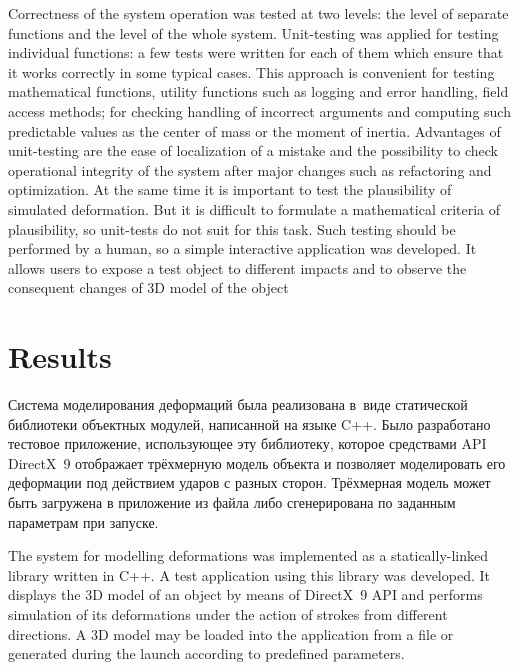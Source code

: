 \documentclass[a4paper, 12pt, titlepage]{extarticle}
\begin{document}
      Correctness of the system operation was tested at two levels: the level of separate
      functions and the level of the whole system. Unit-testing was applied for testing
      individual functions: a few tests were written for each of them which ensure that it works
      correctly in some typical cases. This approach is convenient for testing mathematical
      functions, utility functions such as logging and error handling, field access methods; for
      checking handling of incorrect arguments and computing such predictable values as the center
      of mass or the moment of inertia. Advantages of unit-testing are the ease of
      localization of a mistake and the possibility to check operational integrity of the system
      after major changes such as refactoring and optimization. At the same time it is important to
      test the plausibility of simulated deformation. But it is difficult to formulate a
      mathematical criteria of plausibility, so unit-tests do not suit for this task. Such testing
      should be performed by a human, so a simple interactive application was developed. It allows
      users to expose a test object to different impacts and to observe the consequent changes of 3D
      model of the object

  \section{Results}\label{sec:results}

\begin{original}
    Система моделирования деформаций была реализована в~виде статической
    библиотеки объектных модулей, написанной на языке C++. Было разработано тестовое приложение,
    использующее эту библиотеку, которое средствами API DirectX~9 отображает трёхмерную модель
    объекта и позволяет моделировать его деформации под действием ударов с разных сторон. Трёхмерная
    модель может быть загружена в приложение из файла либо сгенерирована по заданным параметрам при
    запуске.
\end{original}

    The system for modelling deformations was implemented as a statically-linked library written in
    C++. A test application using this library was developed. It displays the 3D model of an object
    by means of DirectX~9 API and performs simulation of its deformations under the action of
    strokes from different directions. A 3D model may be loaded into the application from a file or
    generated during the launch according to predefined parameters.
\end{document}
